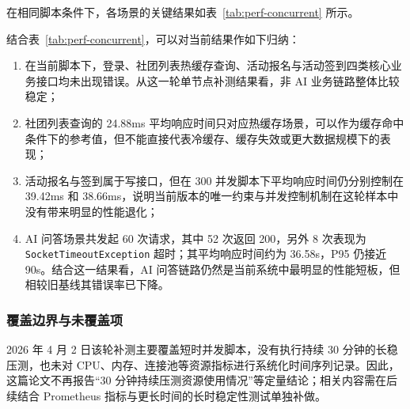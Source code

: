 在相同脚本条件下，各场景的关键结果如表~\ref{tab:perf-concurrent} 所示。

\begin{table}[H]
\centering
\small
\caption{JMeter 补测关键结果}
\label{tab:perf-concurrent}
\end{table}

结合表~\ref{tab:perf-concurrent}，可以对当前结果作如下归纳：
\begin{enumerate}
  \item 在当前脚本下，登录、社团列表热缓存查询、活动报名与活动签到四类核心业务接口均未出现错误。从这一轮单节点补测结果看，非 AI 业务链路整体比较稳定；
  \item 社团列表查询的 24.88ms 平均响应时间只对应热缓存场景，可以作为缓存命中条件下的参考值，但不能直接代表冷缓存、缓存失效或更大数据规模下的表现；
  \item 活动报名与签到属于写接口，但在 300 并发脚本下平均响应时间仍分别控制在 39.42ms 和 38.66ms，说明当前版本的唯一约束与并发控制机制在这轮样本中没有带来明显的性能退化；
  \item AI 问答场景共发起 60 次请求，其中 52 次返回 200，另外 8 次表现为 \texttt{SocketTimeoutException} 超时；其平均响应时间约为 36.58s，P95 仍接近 90s。结合这一结果看，AI 问答链路仍然是当前系统中最明显的性能短板，但相较旧基线其错误率已下降。
\end{enumerate}

\subsubsection{覆盖边界与未覆盖项}

2026 年 4 月 2 日该轮补测主要覆盖短时并发脚本，没有执行持续 30 分钟的长稳压测，也未对 CPU、内存、连接池等资源指标进行系统化时间序列记录。因此，这篇论文不再报告“30 分钟持续压测资源使用情况”等定量结论；相关内容需在后续结合 Prometheus 指标与更长时间的长时稳定性测试单独补做。

